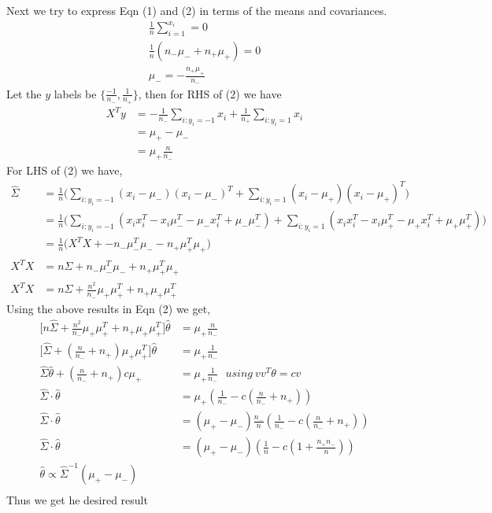 \documentclass{article}
\begin{document}
\vspace*{10pt}
\noindent Next we try to express Eqn (1) and (2) in terms of the means and covariances.
\begin{align*}
    \frac{1}{n}\sum_{i=1}^{x_i} = 0\\
    \frac{1}{n}(n_{-}\mu_{-}+n_{+}\mu_{+}) = 0\\
    \mu_{-} = -\frac{n_{+}\mu_{+}}{n_{-}}
\end{align*}
Let the $y$ labels be $\{\frac{-1}{n_{-}},\frac{1}{n_{+}}\}$, then
for RHS of (2) we have
\begin{align*}
    X^T y &= -\frac{1}{n_{-}}\sum_{i:y_i=-1}^{} x_i + \frac{1}{n_{+}}\sum_{i:y_i=1}^{} x_i \\
          &=  \mu_{+}-\mu_{-}\\
          &=  \mu_{+}\frac{n}{n_{-}}
\end{align*}
For LHS of (2) we have,
\begin{align*}
    \hat{\Sigma} &= \frac{1}{n}\biggl( \sum_{i:y_i=-1}^{}(x_i-\mu_{-})(x_i-\mu_{-})^T + \sum_{i:y_i=1}^{}(x_i-\mu_{+})(x_i-\mu_{+})^T \biggr)\\
                 &= \frac{1}{n}\biggl( \sum_{i:y_i=-1}^{}(x_i x_i^T -x_i\mu_{-}^T -\mu_{-}x_i^T + \mu_{-}\mu_{-}^T) + \sum_{i:y_i=1}^{}(x_i x_i^T -x_i\mu_{+}^T -\mu_{+}x_i^T + \mu_{+}\mu_{+}^T) \biggr)\\
                 &= \frac{1}{n}\biggl(X^TX + - n_{-}\mu_{-}^T\mu_{-} - n_{+}\mu_{+}^T\mu_{+} \biggr)\\
    X^TX         &= n \hat{\Sigma} +  n_{-}\mu_{-}^T\mu_{-} + n_{+}\mu_{+}^T\mu_{+}\\
    X^TX         &= n \hat{\Sigma} + \frac{n^2}{n_{-}}\mu_{+}\mu_{+}^T + n_{+}\mu_{+}\mu_{+}^T
\end{align*}
Using the above results in Eqn (2) we get,
\begin{align*}
    \biggl[n \hat{\Sigma} + \frac{n^2}{n_{-}}\mu_{+}\mu_{+}^T + n_{+}\mu_{+}\mu_{+}^T\biggr]\hat{\theta} &= \mu_{+}\frac{n}{n_{-}} \\
    \biggl[\hat{\Sigma} + (\frac{n}{n_{-}} + n_{+})\mu_{+}\mu_{+}^T\biggr]\hat{\theta} &= \mu_{+}\frac{1}{n_{-}}\\
    \hat{\Sigma} \hat{\theta} + (\frac{n}{n_{-}} + n_{+})c\mu_{+} &= \mu_{+}\frac{1}{n_{-}}\ \ \ using\ v v^T\theta = cv \\ 
    \hat{\Sigma}\cdot\hat{\theta} &= \mu_{+}(\frac{1}{n_{-}}-c(\frac{n}{n_{-}} + n_{+}))\\
    \hat{\Sigma}\cdot\hat{\theta} &= (\mu_{+}-\mu_{-})\frac{n_{-}}{n}(\frac{1}{n_{-}}-c(\frac{n}{n_{-}} + n_{+}))\\
    \hat{\Sigma}\cdot\hat{\theta} &= (\mu_{+}-\mu_{-})(\frac{1}{n}-c(1 + \frac{n_{+}n_{-}}{n}))\\
    \hat{\theta} \propto \hat{\Sigma}^{-1}(\mu_{+}-\mu_{-})\\
\end{align*}
Thus we get he desired result
\end{document}
